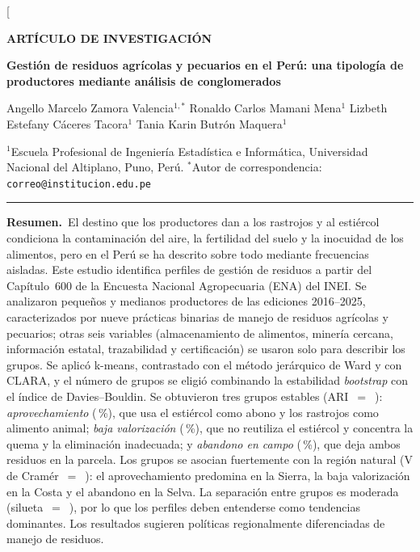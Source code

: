 \documentclass[10pt,twocolumn,a4paper]{article}
\begin{document}
\twocolumn[{%
\begin{flushleft}
{\sffamily\scriptsize\color{WTeal}\bfseries ARTÍCULO DE INVESTIGACIÓN}\par\vspace{2mm}
{\sffamily\bfseries\LARGE\color{WBlue}
Gestión de residuos agrícolas y pecuarios en el Perú: una tipología de productores mediante análisis de conglomerados\par}
\vspace{3.5mm}
{\sffamily\normalsize
Angello Marcelo Zamora Valencia$^{1,*}$\quad
Ronaldo Carlos Mamani Mena$^{1}$\quad
Lizbeth Estefany Cáceres Tacora$^{1}$\quad
Tania Karin Butrón Maquera$^{1}$\par}
\vspace{1.5mm}
{\footnotesize\color{WGray}
$^{1}$Escuela Profesional de Ingeniería Estadística e Informática, Universidad Nacional del Altiplano, Puno, Perú.\quad
$^{*}$Autor de correspondencia: \texttt{correo@institucion.edu.pe}\par}
{\color{WBlue}\rule{\textwidth}{0.8pt}}
\end{flushleft}
\vspace{-1mm}
\begin{tcolorbox}[enhanced,colback=WLight,colframe=WLight,boxrule=0pt,
  borderline west={2.5pt}{0pt}{WBlue},arc=0pt,left=4mm,right=4mm,top=2.5mm,bottom=2.5mm]
\small
{\sffamily\bfseries\color{WBlue}Resumen.}\ El destino que los productores dan a los rastrojos y al estiércol condiciona la contaminación del aire, la fertilidad del suelo y la inocuidad de los alimentos, pero en el Perú se ha descrito sobre todo mediante frecuencias aisladas. Este estudio identifica perfiles de gestión de residuos a partir del Capítulo~600 de la Encuesta Nacional Agropecuaria (ENA) del INEI. Se analizaron \nValid{} pequeños y medianos productores de las ediciones 2016--2025, caracterizados por nueve prácticas binarias de manejo de residuos agrícolas y pecuarios; otras seis variables (almacenamiento de alimentos, minería cercana, información estatal, trazabilidad y certificación) se usaron solo para describir los grupos. Se aplicó k-means, contrastado con el método jerárquico de Ward y con CLARA, y el número de grupos se eligió combinando la estabilidad \textit{bootstrap} con el índice de Davies--Bouldin. Se obtuvieron tres grupos estables (ARI~$=$~\ariBoot): \textit{aprovechamiento} (\pctCone\,\%), que usa el estiércol como abono y los rastrojos como alimento animal; \textit{baja valorización} (\pctCtwo\,\%), que no reutiliza el estiércol y concentra la quema y la eliminación inadecuada; y \textit{abandono en campo} (\pctCthree\,\%), que deja ambos residuos en la parcela. Los grupos se asocian fuertemente con la región natural (V de Cramér~$=$~\VRegion): el aprovechamiento predomina en la Sierra, la baja valorización en la Costa y el abandono en la Selva. La separación entre grupos es moderada (silueta~$=$~\silK), por lo que los perfiles deben entenderse como tendencias dominantes. Los resultados sugieren políticas regionalmente diferenciadas de manejo de residuos.


\end{tcolorbox}}
\end{document}
